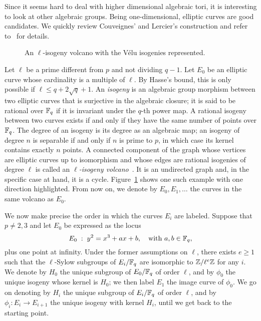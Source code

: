 \documentclass{sig-alternate}
\begin{document}
Since it seems hard to deal with higher dimensional algebraic tori, it
is interesting to look at other algebraic groups. Being
one-dimensional, elliptic curves are good candidates. We quickly
review Couveignes' and Lercier's construction and refer
to~\cite{couveignes+lercier11} for details.

\begin{figure}
  \centering
  \caption{An $\ell$-isogeny volcano with the Vélu isogenies
    represented.}
  \label{fig:volcano}
\end{figure}

Let $\ell$ be a prime different from $p$ and not dividing $q-1$. Let
$E_0$ be an elliptic curve whose cardinality is a multiple of
$\ell$. By Hasse's bound, this is only possible if $\ell\le q +
2\sqrt{q} + 1$. An \emph{isogeny} is an algebraic group morphism
between two elliptic curves that is surjective in the algebraic
closure; it is said to be rational over $\mathbb{F}_q$ if it is invariant
under the $q$-th power map. A rational isogeny between two curves
exists if and only if they have the same number of points over
$\mathbb{F}_q$. The degree of an isogeny is its degree as an algebraic map; an
isogeny of degree $n$ is separable if and only if $n$ is prime to $p$,
in which case its kernel contains exactly $n$ points. A connected
component of the graph whose vertices are elliptic curves up to
isomorphism and whose edges are rational isogenies of degree $\ell$ is
called an \emph{$\ell$-isogeny
  volcano}~\cite{kohel,fouquet+morain02}. It is an undirected graph
and, in the specific case at hand, it is a cycle.
Figure~\ref{fig:volcano} shows one such example with one direction
highlighted. From now on, we denote by $E_0,E_1,\dots$ the curves in
the same volcano as $E_0$.

We now make precise the order in which the curves $E_i$ are
labeled. Suppose that $p\ne2,3$ and let $E_0$ be expressed as the
locus
\begin{equation}
  E_0 \;:\; y^2 = x^3 + ax + b,
  \quad\text{with $a,b\in\mathbb{F}_q$},
\end{equation}
plus one point at infinity. Under the former assumptions on $\ell$,
there exists $e\ge1$ such that the $\ell$-Sylow subgroups of
$E_i/\mathbb{F}_q$ are isomorphic to $\mathbb{Z}/\ell^e\mathbb{Z}$ for any $i$. We denote by
$H_0$ the unique subgroup of $E_0/\mathbb{F}_q$ of order $\ell$, and by
$\phi_0$ the unique isogeny whose kernel is $H_0$; we then label $E_1$
the image curve of $\phi_0$. We go on denoting by $H_i$ the unique
subgroup of $E_i/\mathbb{F}_q$ of order $\ell$, and by $\phi_i:E_i\to E_{i+1}$
the unique isogeny with kernel $H_i$, until we get back to the
starting point.
\end{document}
